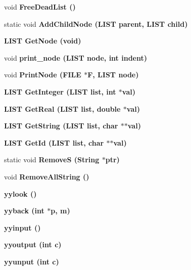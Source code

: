 \begin{CompactItemize}
\item 
void \bf{Free\-Dead\-List} ()
\item 
static void \bf{Add\-Child\-Node} (\bf{LIST} parent, \bf{LIST} child)
\item 
\bf{LIST} \bf{Get\-Node} (void)
\item 
void \bf{print\_\-node} (\bf{LIST} \bf{node}, int indent)
\item 
void \bf{Print\-Node} (FILE $\ast$\bf{F}, \bf{LIST} \bf{node})
\item 
\bf{LIST} \bf{Get\-Integer} (\bf{LIST} \bf{list}, int $\ast$val)
\item 
\bf{LIST} \bf{Get\-Real} (\bf{LIST} \bf{list}, double $\ast$val)
\item 
\bf{LIST} \bf{Get\-String} (\bf{LIST} \bf{list}, char $\ast$$\ast$val)
\item 
\bf{LIST} \bf{Get\-Id} (\bf{LIST} \bf{list}, char $\ast$$\ast$val)
\item 
static void \bf{Remove\-S} (\bf{String} $\ast$ptr)
\item 
void \bf{Remove\-All\-String} ()
\item 
\bf{yylook} ()
\item 
\bf{yyback} (int $\ast$p, m)
\item 
\bf{yyinput} ()
\item 
\bf{yyoutput} (int c)
\item 
\bf{yyunput} (int c)
\end{CompactItemize}
